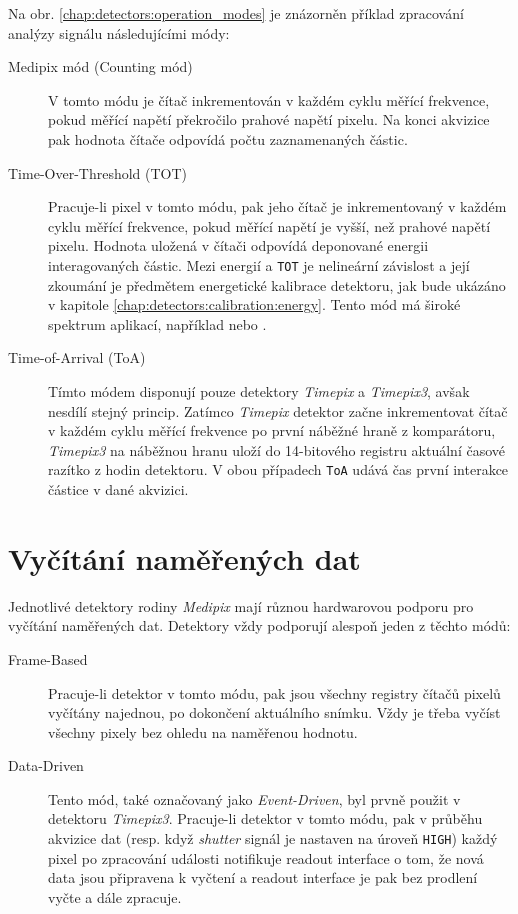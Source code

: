 Na obr. \ref{chap:detectors:operation_modes} je znázorněn příklad zpracování analýzy signálu následujícími módy:
\begin{description}
    \item[Medipix mód (Counting mód)] V tomto módu je čítač inkrementován v každém cyklu měřící frekvence, pokud měřící napětí překročilo prahové napětí pixelu. Na konci akvizice pak hodnota čítače odpovídá počtu zaznamenaných částic.
    \item[Time-Over-Threshold (TOT)] Pracuje-li pixel v tomto módu, pak jeho čítač je inkrementovaný v každém cyklu měřící frekvence, pokud měřící napětí je vyšší, než prahové napětí pixelu. Hodnota uložená v čítači odpovídá deponované energii interagovaných částic. Mezi energií a \texttt{TOT} je nelineární závislost a její zkoumání je předmětem energetické kalibrace detektoru, jak bude ukázáno v kapitole \ref{chap:detectors:calibration:energy}. Tento mód má široké spektrum aplikací, například \cite{tot_app_counting} nebo \cite{tpx_app_radiotherapy}.
    \item[Time-of-Arrival (ToA)] Tímto módem disponují pouze detektory \textit{Timepix} a \textit{Timepix3}, avšak nesdílí stejný princip. Zatímco \textit{Timepix} detektor začne inkrementovat čítač v každém cyklu měřící frekvence po první náběžné hraně z komparátoru, \textit{Timepix3} na náběžnou hranu uloží do 14-bitového registru aktuální časové razítko z hodin detektoru. V obou případech \texttt{ToA} udává čas první interakce částice v dané akvizici.
\end{description}

\section{Vyčítání naměřených dat}\label{chap:detectors:readout}
Jednotlivé detektory rodiny \textit{Medipix} mají různou hardwarovou podporu pro vyčítání naměřených dat. Detektory vždy podporují alespoň jeden z těchto módů:
\begin{description}
	\item[Frame-Based] Pracuje-li detektor v tomto módu, pak jsou všechny registry čítačů pixelů vyčítány najednou, po dokončení aktuálního snímku. Vždy je třeba vyčíst všechny pixely bez ohledu na naměřenou hodnotu.
	\item[Data-Driven] Tento mód, také označovaný jako \textit{Event-Driven}, byl prvně použit v detektoru \textit{Timepix3}. Pracuje-li detektor v tomto módu, pak v průběhu akvizice dat (resp. když \textit{shutter} signál je nastaven na úroveň \texttt{HIGH}) každý pixel po zpracování události notifikuje readout interface o tom, že nová data jsou připravena k vyčtení a readout interface je pak bez prodlení vyčte a dále zpracuje.
\end{description}

